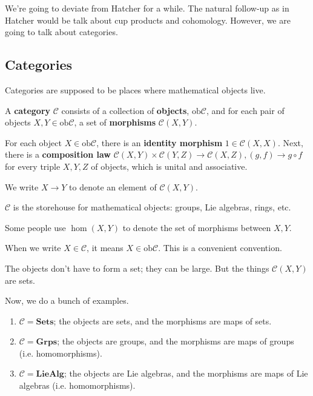 
We're going to deviate from Hatcher for a while. The natural follow-up as in 
Hatcher would be talk about cup products and cohomology. However, we are going
to talk about categories. 

\subsection{Categories}

\newcommand{\ob}{\mathrm{ob}}
Categories are supposed to be places where mathematical objects live. 

\begin{definition} 
A \textbf{category} $\mathcal{C}$ consists of a collection of \textbf{objects},
$\mathrm{ob}\mathcal{C}$, and for each pair of objects $X, Y \in
\mathrm{ob}\mathcal{C}$, a set
of \textbf{morphisms} $\mathcal{C}(X, Y)$. 

For each object $X \in \ob\mathcal{C}$, there is an \textbf{identity morphism}
$1 \in \mathcal{C}(X, X)$. Next, there is a \textbf{composition law}
$\mathcal{C}(X, Y) \times \mathcal{C}(Y, Z) \to \mathcal{C}(X, Z), (g, f) \to g
\circ f$ for every
triple $X, Y, Z$ of objects, which is unital and associative. 

We write $X \to Y$ to denote an element of $\mathcal{C}(X, Y)$.
\end{definition} 

$\mathcal{C}$ is the storehouse for mathematical objects: groups, Lie algebras,
rings, etc.

\begin{remark} 
Some people use $\hom(X, Y)$  to denote the set of morphisms between $X, Y$.
\end{remark} 

\begin{remark} 
When we write $X \in \mathcal{C}$, it means $X \in \ob \mathcal{C}$. This is a
convenient convention. 
\end{remark} 

\begin{remark} 
The objects don't have to form a set; they can be large. But the things
$\mathcal{C}(X, Y)$ are sets.
\end{remark} 

Now, we do a bunch of examples.

\begin{example} 
\begin{enumerate}
\item $\mathcal{C}  = \mathbf{Sets}$; the objects are sets, and the morphisms
are maps of sets. 
\item $\mathcal{C} = \mathbf{Grps}$; the objects are groups, and the morphisms
are maps of groups (i.e. homomorphisms).
\item $\mathcal{C} = \mathbf{LieAlg}$; the objects are Lie algebras, and the
morphisms are maps of Lie algebras (i.e. homomorphisms). 
\end{enumerate}
\end{example} 

